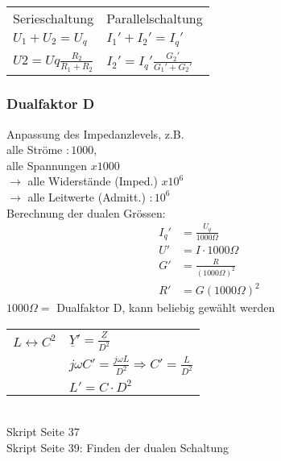 \begin{tabular}{ll}
Serieschaltung & Parallelschaltung \\
$U_1+U_2=U_q$
& $I_1'+I_2'=I_q'$\\ $U2=Uq\frac{R_2}{R_1+R_2}$ & $I_2'=I_q'\frac{G_2'}{G_1'+G_2'}$\\
\end{tabular}

\subsubsection{Dualfaktor D}
Anpassung des Impedanzlevels, z.B.\\
alle Ströme $:1000$,\\
alle Spannungen $x1000$\\
$\rightarrow$ alle Widerstände (Imped.) $x10^6$\\
$\rightarrow$ alle Leitwerte (Admitt.) $:10^6$\\
Berechnung der dualen Grössen:\\
\begin{align}
	I_q'&=\frac{U_q}{1000\Omega }\nonumber\\
	U'&=I\cdot 1000\Omega \nonumber\\
	G'&=\frac{R}{\left(1000\Omega\right)^2}\nonumber\\
	R'&=G\left(1000 \Omega\right)^2\nonumber
\end{align}
$1000 \Omega =$ Dualfaktor D, kann beliebig gewählt werden\\
\begin{tabular}{ll}
	$L \leftrightarrow C^2$ & $\underline{Y}'=\frac{\underline{Z}}{D^2}$\\
	& $j\omega C'=\frac{j \omega L}{D^2} \Rightarrow C'=\frac{L}{D^2}$\\
	& $L'=C\cdot D^2$
\end{tabular}\\
Skript Seite 37\\

Skript Seite 39: Finden der dualen Schaltung\\


